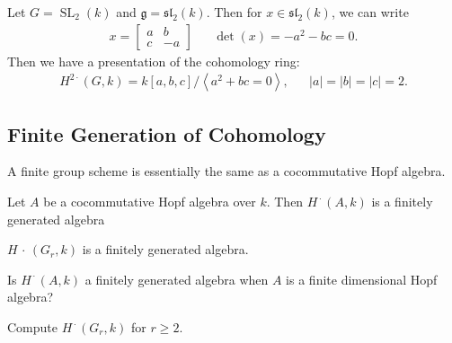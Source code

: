 \begin{example}[?]

Let \(G = {\operatorname{SL}}_2(k)\) and
\({\mathfrak{g}}= {\mathfrak{sl}}_2(k)\). Then for
\(x\in {\mathfrak{sl}}_2(k)\), we can write
\begin{align*}  
x = \begin{bmatrix}
a & b \\
c & -a
\end{bmatrix} && \det(x) = -a^2 - bc = 0
.\end{align*}
Then we have a presentation of the cohomology ring:
\begin{align*}  
H^{2\cdot}(G, k) = k[a,b,c] / \left\langle{a^2 + bc = 0}\right\rangle, && {\left\lvert {a} \right\rvert} = {\left\lvert {b} \right\rvert} = {\left\lvert {c} \right\rvert} = 2
.\end{align*}

\end{example}

\hypertarget{finite-generation-of-cohomology}{%
\subsection{Finite Generation of
Cohomology}\label{finite-generation-of-cohomology}}

A finite group scheme is essentially the same as a cocommutative Hopf
algebra.

\begin{theorem}

Let \(A\) be a cocommutative Hopf algebra over \(k\). Then
\(H^{\,\cdot\,}(A, k)\) is a finitely generated algebra

\end{theorem}

\begin{example}[?]

\(H{\,\cdot\,}(G_r, k)\) is a finitely generated algebra.

\end{example}

\begin{problem}[Open]

Is \(H^{\,\cdot\,}(A, k)\) a finitely generated algebra when \(A\) is a
finite dimensional Hopf algebra?

\end{problem}

\begin{problem}[Open]

Compute \(H^{\,\cdot\,}(G_r, k)\) for \(r\geq 2\).

\end{problem}

